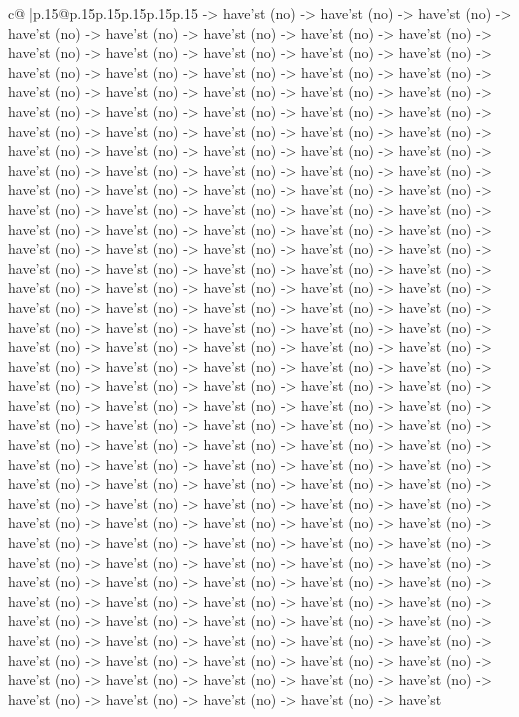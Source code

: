 \documentclass{article}
\begin{document}
{\begin{supertabular}{c@{$\;$}|p{.15\linewidth}@{}p{.15\linewidth}p{.15\linewidth}p{.15\linewidth}p{.15\linewidth}p{.15\linewidth}}
{{{{-}> have'st (no) {-}> have'st (no) {-}> have'st (no) {-}> have'st (no) {-}> have'st (no) {-}> have'st (no) {-}> have'st (no) {-}> have'st (no) {-}> have'st (no) {-}> have'st (no) {-}> have'st (no) {-}> have'st (no) {-}> have'st (no) {-}> have'st (no) {-}> have'st (no) {-}> have'st (no) {-}> have'st (no) {-}> have'st (no) {-}> have'st (no) {-}> have'st (no) {-}> have'st (no) {-}> have'st (no) {-}> have'st (no) {-}> have'st (no) {-}> have'st (no) {-}> have'st (no) {-}> have'st (no) {-}> have'st (no) {-}> have'st (no) {-}> have'st (no) {-}> have'st (no) {-}> have'st (no) {-}> have'st (no) {-}> have'st (no) {-}> have'st (no) {-}> have'st (no) {-}> have'st (no) {-}> have'st (no) {-}> have'st (no) {-}> have'st (no) {-}> have'st (no) {-}> have'st (no) {-}> have'st (no) {-}> have'st (no) {-}> have'st (no) {-}> have'st (no) {-}> have'st (no) {-}> have'st (no) {-}> have'st (no) {-}> have'st (no) {-}> have'st (no) {-}> have'st (no) {-}> have'st (no) {-}> have'st (no) {-}> have'st (no) {-}> have'st (no) {-}> have'st (no) {-}> have'st (no) {-}> have'st (no) {-}> have'st (no) {-}> have'st (no) {-}> have'st (no) {-}> have'st (no) {-}> have'st (no) {-}> have'st (no) {-}> have'st (no) {-}> have'st (no) {-}> have'st (no) {-}> have'st (no) {-}> have'st (no) {-}> have'st (no) {-}> have'st (no) {-}> have'st (no) {-}> have'st (no) {-}> have'st (no) {-}> have'st (no) {-}> have'st (no) {-}> have'st (no) {-}> have'st (no) {-}> have'st (no) {-}> have'st (no) {-}> have'st (no) {-}> have'st (no) {-}> have'st (no) {-}> have'st (no) {-}> have'st (no) {-}> have'st (no) {-}> have'st (no) {-}> have'st (no) {-}> have'st (no) {-}> have'st (no) {-}> have'st (no) {-}> have'st (no) {-}> have'st (no) {-}> have'st (no) {-}> have'st (no) {-}> have'st (no) {-}> have'st (no) {-}> have'st (no) {-}> have'st (no) {-}> have'st (no) {-}> have'st (no) {-}> have'st (no) {-}> have'st (no) {-}> have'st (no) {-}> have'st (no) {-}> have'st (no) {-}> have'st (no) {-}> have'st (no) {-}> have'st (no) {-}> have'st (no) {-}> have'st (no) {-}> have'st (no) {-}> have'st (no) {-}> have'st (no) {-}> have'st (no) {-}> have'st (no) {-}> have'st (no) {-}> have'st (no) {-}> have'st (no) {-}> have'st (no) {-}> have'st (no) {-}> have'st (no) {-}> have'st (no) {-}> have'st (no) {-}> have'st (no) {-}> have'st (no) {-}> have'st (no) {-}> have'st (no) {-}> have'st (no) {-}> have'st (no) {-}> have'st (no) {-}> have'st (no) {-}> have'st (no) {-}> have'st (no) {-}> have'st (no) {-}> have'st (no) {-}> have'st (no) {-}> have'st (no) {-}> have'st (no) {-}> have'st (no) {-}> have'st (no) {-}> have'st (no) {-}> have'st (no) {-}> have'st (no) {-}> have'st (no) {-}> have'st (no) {-}> have'st (no) {-}> have'st (no) {-}> have'st (no) {-}> have'st (no) {-}> have'st (no) {-}> have'st (no) {-}> have'st (no) {-}> have'st (no) {-}> have'st (no) {-}> have'st (no) {-}> have'st (no) {-}> have'st (no) {-}> have'st (no) {-}> have'st (no) {-}> have'st (no) {-}> have'st (no) {-}> have'st (no) {-}> have'st (no) {-}> have'st (no) {-}> have'st (no) {-}> have'st (no) {-}> have'st (no) {-}> have'st (no) {-}> have'st (no) {-}> have'st (no) {-}> have'st (no) {-}> have'st (no) {-}> have'st (no) {-}> have'st (no) {-}> have'st (no) {-}> have'st }}}
\end{supertabular}}
\end{document}
